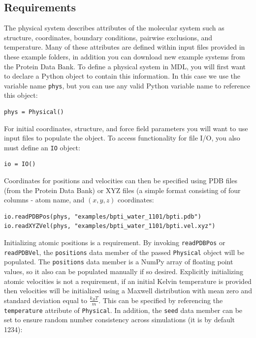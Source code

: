 \documentclass[11pt]{report}
\begin{document}
\subsection{Requirements}

The physical system describes attributes of the 
molecular system such as structure, coordinates, 
boundary conditions, pairwise exclusions, and temperature.
Many of these attributes are defined within input files provided
in these example folders, in addition you can download new
example systems from the Protein Data Bank.  To define a physical
system in MDL, you will first want to declare a Python object
to contain this information.  In this case we use the variable
name \texttt{phys}, but you can use any valid Python variable
name to reference this object:

\begin{verbatim}
phys = Physical()
\end{verbatim}

For initial coordinates, structure, and force field parameters
you will want to use input files to populate the object.  To
access functionality for file I/O, you also must define an
\texttt{IO} object:

\begin{verbatim}
io = IO()
\end{verbatim}

Coordinates for positions and velocities can then be specified
using PDB files (from the Protein Data Bank) or XYZ files
(a simple format consisting of four columns - atom name, and
\begin{math} (x,y,z) \end{math} coordinates:

\begin{verbatim}
io.readPDBPos(phys, "examples/bpti_water_1101/bpti.pdb")
io.readXYZVel(phys, "examples/bpti_water_1101/bpti.vel.xyz")
\end{verbatim}

Initializing atomic positions is a requirement.  By invoking
\texttt{readPDBPos} or \texttt{readPDBVel}, the \texttt{positions}
data member of the passed \texttt{Physical} object will be populated.
The \texttt{positions} data member is a NumPy array of floating
point values, so it also can be populated manually if so desired.
Explicitly initializing atomic velocities is not a requirement, 
if an initial Kelvin temperature is provided then velocities
will be initialized using a Maxwell distribution with mean zero
and standard deviation equal to \begin{math}\frac{k_B T}{m}\end{math}.
This can be specified by referencing the \texttt{temperature}
attribute of \texttt{Physical}.  In addition, the \texttt{seed}
data member can be set to ensure random number consistency across 
simulations (it is by default 1234):
\end{document}
